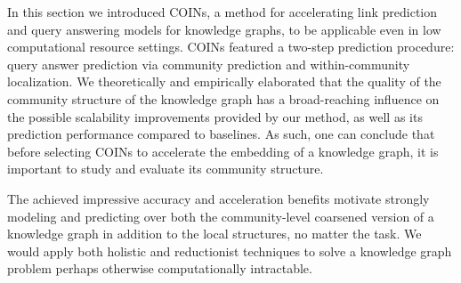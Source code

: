 In this section we introduced COINs, a method for accelerating link prediction and query answering models for knowledge graphs, to be applicable even in low computational resource settings. COINs featured a two-step prediction procedure: query answer prediction via community prediction and within-community localization. 
We theoretically and empirically elaborated that the quality of the community structure of the knowledge graph has a broad-reaching influence on the possible scalability improvements provided by our method, as well as its prediction performance compared to baselines. As such, one can conclude that before selecting COINs to accelerate the embedding of a knowledge graph, it is important to study and evaluate its community structure. 

The achieved impressive accuracy and acceleration benefits motivate strongly modeling and predicting over both the community-level coarsened version of a knowledge graph in addition to the local structures, no matter the task. We would apply both holistic and reductionist techniques to solve a knowledge graph problem perhaps otherwise computationally intractable.